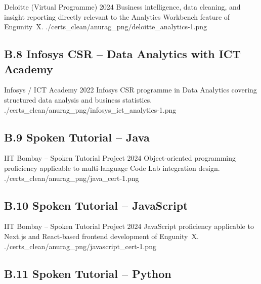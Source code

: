 \certentry
  {Deloitte (Virtual Programme)}
  {2024}
  {Business intelligence, data cleaning, and insight reporting directly relevant
   to the Analytics Workbench feature of Engunity~X.}
  {./certs_clean/anurag_png/deloitte_analytics-1.png}

\subsection*{B.8 \quad Infosys CSR -- Data Analytics with ICT Academy}

\certentry
  {Infosys / ICT Academy}
  {2022}
  {Infosys CSR programme in Data Analytics covering structured data analysis
   and business statistics.}
  {./certs_clean/anurag_png/infosys_ict_analytics-1.png}

\subsection*{B.9 \quad Spoken Tutorial -- Java}

\certentry
  {IIT Bombay -- Spoken Tutorial Project}
  {2024}
  {Object-oriented programming proficiency applicable to multi-language Code
   Lab integration design.}
  {./certs_clean/anurag_png/java_cert-1.png}

\subsection*{B.10 \quad Spoken Tutorial -- JavaScript}

\certentry
  {IIT Bombay -- Spoken Tutorial Project}
  {2024}
  {JavaScript proficiency applicable to Next.js and React-based frontend
   development of Engunity~X.}
  {./certs_clean/anurag_png/javascript_cert-1.png}

\subsection*{B.11 \quad Spoken Tutorial -- Python}

